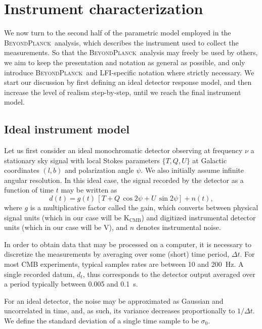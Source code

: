 \documentclass[onecolumn]{aa}
\newcommand{\BP}{\textsc{BeyondPlanck}}
\begin{document}
\section{Instrument characterization}
\label{sec:instrument}

We now turn to the second half of the parametric model
employed in the \BP\ analysis, which describes the instrument used to
collect the measurements. So that the \BP\ analysis may freely be used by
others, we aim to
keep the presentation and notation as general as possible, and only
introduce \BP\ and LFI-specific notation where strictly necessary. We
start our discussion by first defining an ideal detector response
model, and then increase the level of realism step-by-step, until we
reach the final instrument model.

\subsection{Ideal instrument model}
\label{sec:ideal_model}

Let us first consider an ideal monochromatic detector observing at
frequency $\nu$ a stationary sky signal with local Stokes parameters
$\{T,Q,U\}$ at Galactic coordinates $(l,b)$ and polarization angle
$\psi$.  We also initially assume infinite angular resolution. In this 
ideal case, the signal recorded by the detector as a function of time $t$ 
may be written as
\begin{equation}
  d(t) = g(t)\,\left[T + Q\,\cos2\psi + U\,\sin2\psi\right]
  + n(t),
  \label{eq:ideal_model}
\end{equation}
where $g$ is a multiplicative factor called the gain, which converts
between physical signal units (which in our case will be
$\mathrm{K}_{\mathrm{CMB}}$) and digitized instrumental detector units
(which in our case will be V), and $n$ denotes instrumental
noise.

In order to obtain data that may be processed on a computer, it is
necessary to discretize the measurements by averaging over some
(short) time period, $\Delta t$. For most CMB experiments, typical
samples rates are between 10 and 200~Hz. A single recorded datum,
$d_t$, thus corresponds to the detector output averaged over a period 
typically between 0.005 and 0.1~s.

For an ideal detector, the noise may be approximated as Gaussian and
uncorrelated in time, and, as such, its variance decreases
proportionally to $1/\Delta t$. We define the standard deviation of a
single time sample to be $\sigma_0$.
\end{document}
